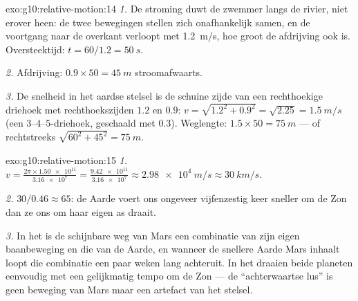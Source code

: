 \begin{solution}{exo:g10:relative-motion:14}
\emph{1.} De stroming duwt de zwemmer langs de rivier, niet erover
heen: de twee bewegingen stellen zich onafhankelijk samen, en de
voortgang naar de overkant verloopt met \qty{1.2}{m/s}, hoe groot de
afdrijving ook is. Oversteektijd: $t = 60/1.2 = \qty{50}{s}$.

\emph{2.} Afdrijving: $0.9 \times 50 = \qty{45}{m}$ stroomafwaarts.

\emph{3.} De snelheid in het aardse stelsel is de schuine zijde van een
rechthoekige driehoek met rechthoekszijden $1.2$ en $0.9$:
$v = \sqrt{1.2^2 + 0.9^2} = \sqrt{2.25} = \qty{1.5}{m/s}$ (een
$3$--$4$--$5$-driehoek, geschaald met $0.3$). Weglengte:
$1.5 \times 50 = \qty{75}{m}$ --- of rechtstreeks
$\sqrt{60^2 + 45^2} = \qty{75}{m}$.
\end{solution}

\begin{solution}{exo:g10:relative-motion:15}
\emph{1.} $v = \frac{2\pi \times \num{1.50e11}}{\num{3.16e7}}
= \frac{\num{9.42e11}}{\num{3.16e7}} \approx \qty{2.98e4}{m/s}
\approx \qty{30}{km/s}$.

\emph{2.} $30 / 0.46 \approx 65$: de Aarde voert ons ongeveer
vijfenzestig keer sneller om de Zon dan ze ons om haar eigen as draait.

\emph{3.} In het  is de schijnbare weg van Mars een
combinatie van zijn eigen baanbeweging en die van de Aarde, en wanneer de
snellere Aarde Mars inhaalt loopt die combinatie een paar weken lang
achteruit. In het  draaien beide planeten
eenvoudig met een gelijkmatig tempo om de Zon --- de ``achterwaartse
lus'' is geen beweging van Mars maar een artefact van het stelsel.
\end{solution}

